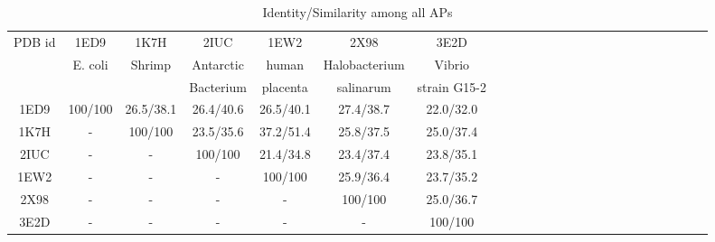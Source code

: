 \begin{center} 
\begin{table*} 
\caption {Identity/Similarity among all APs }  \label{table:APSEQ}  
\begin{tabular}{ c c  c c  c c  c c  c c  c c  c c  c c  c  c  c  c c  c c  c } 
\hline 
PDB id&  1ED9 & 1K7H & 2IUC & 1EW2 & 2X98 & 3E2D \\ 
&  E. coli & Shrimp &Antarctic &  human & Halobacterium & Vibrio \\ 
&  & &Bacterium &  placenta & salinarum & strain G15-2 \\ 
\hline 
 1ED9 & 100/100 & 26.5/38.1 & 26.4/40.6 & 26.5/40.1 & 27.4/38.7 & 22.0/32.0 \\ 
 1K7H & - & 100/100 & 23.5/35.6 & 37.2/51.4 & 25.8/37.5 & 25.0/37.4 \\ 
 2IUC & - & - & 100/100 & 21.4/34.8 & 23.4/37.4 & 23.8/35.1 \\ 
 1EW2 & - & - & - & 100/100 & 25.9/36.4 & 23.7/35.2 \\ 
 2X98 & - & - & - & - & 100/100 & 25.0/36.7 \\ 
 3E2D & - & - & - & - & - & 100/100 \\ 
\hline 
\end{tabular} 
\end{table*} 
\end{center} 
